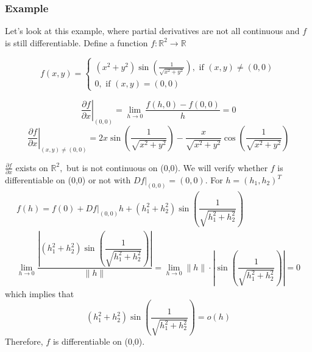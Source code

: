 \documentclass[12pt, t]{beamer}
\begin{document}
\begin{frame}[allowframebreaks]
    \frametitle{Example}
    Let's look at this example, where partial derivatives are not all continuous and $f$ is still differentiable.
    Define a function $f: \mathbb{R}^{2} \rightarrow \mathbb{R}$

    $$f(x, y)= \left\{\begin{array}{l}
            \left(x^{2}+y^{2}\right) \sin \left(\frac{1}{\sqrt{x^{2}+y^{2}}}\right), \text { if }(x, y) \neq(0,0) \\
            0, \text { if }(x, y)=(0,0)
        \end{array}\right.     $$

    $$\left.\frac{\partial f}{\partial x}\right|_{(0,0)}=\lim _{h \rightarrow 0} \frac{f(h, 0)-f(0,0)}{h}=0 $$
    $$\left.\frac{\partial f}{\partial x}\right|_{(x, y) \neq(0,0)}=2 x \sin \left(\frac{1}{\sqrt{x^{2}+y^{2}}}\right)-\frac{x}{\sqrt{x^{2}+y^{2}}} \cos \left(\frac{1}{\sqrt{x^{2}+y^{2}}}\right)$$

    $\frac{\partial f}{\partial x}$ exists on $\mathbb{R}^{2},$ but is not continuous on (0,0).
    \newpage
    We will verify whether $f$ is differentiable on (0,0) or not with $\left.D f\right|_{(0,0)}=(0,0) .$ For $h=\left(h_{1}, h_{2}\right)^{T}$
    \[
        \begin{array}{c}
            f(h)=f(0)+\left.D f\right|_{(0,0)} h+\left(h_{1}^{2}+h_{2}^{2}\right) \sin \left(\dfrac{1}{\sqrt{h_{1}^{2}+h_{2}^{2}}}\right) \\
            \lim _{h \rightarrow 0} \dfrac{\left|\left(h_{1}^{2}+h_{2}^{2}\right) \sin \left(\dfrac{1}{\sqrt{h_{1}^{2}+h_{2}^{2}}}\right)\right|}{\|h\|}=\lim _{h \rightarrow 0}\|h\| \cdot\left|\sin \left(\dfrac{1}{\sqrt{h_{1}^{2}+h_{2}^{2}}}\right)\right|=0
        \end{array}
    \]
    which implies that
    \[
        \left(h_{1}^{2}+h_{2}^{2}\right) \sin \left(\frac{1}{\sqrt{h_{1}^{2}+h_{2}^{2}}}\right)=o(h)
    \]
    Therefore, $f$ is differentiable on (0,0).
\end{frame}
\end{document}
